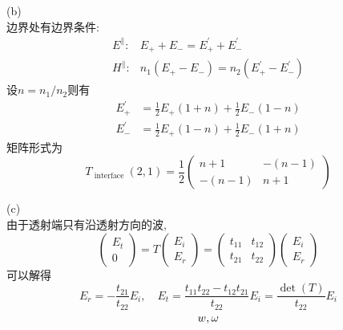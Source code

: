 \documentclass[UTF8,9pt]{ctexart}
\begin{document}
(b)\\ 
边界处有边界条件:
$$\begin{array}{cc}{E^{\| } :} & {E_{+}+E_{-}=E_{+}^{\prime}+E_{-}^{\prime}} \\ {H^{ \|} :} & {n_{1}\left(E_{+}-E_{-}\right)=n_{2}\left(E_{+}^{\prime}-E_{-}^{\prime}\right)}\end{array}$$
设$n=n_1/n_2$则有
$$ 
\begin{aligned} E_{+}^{\prime} &=\frac{1}{2} E_{+}(1+n)+\frac{1}{2} E_{-}(1-n) \\ E_{-}^{\prime} &=\frac{1}{2} E_{+}(1-n)+\frac{1}{2} E_{-}(1+n) \end{aligned}
 $$
矩阵形式为
$$ 
T_{\text { interface }}(2,1)=\frac{1}{2} \left( \begin{array}{cc}{n+1} & {-(n-1)} \\ {-(n-1)} & {n+1}\end{array}\right)
 $$

 (c)\\
由于透射端只有沿透射方向的波, 
$$ 
\left( \begin{array}{c}{E_{t}} \\ {0}\end{array}\right)=T \left( \begin{array}{c}{E_{i}} \\ {E_{r}}\end{array}\right)=\left( \begin{array}{cc}{t_{11}} & {t_{12}} \\ {t_{21}} & {t_{22}}\end{array}\right) \left( \begin{array}{c}{E_{i}} \\ {E_{r}}\end{array}\right)
 $$
可以解得
$$ 
E_{r}=-\frac{t_{21}}{t_{22}} E_{i}, \quad E_{t}=\frac{t_{11} t_{22}-t_{12} t_{21}}{t_{22}} E_{i}=\frac{\operatorname{det}(T)}{t_{22}} E_{i}
 $$
 \qqed
 $$w,\omega$$
\end{document}
